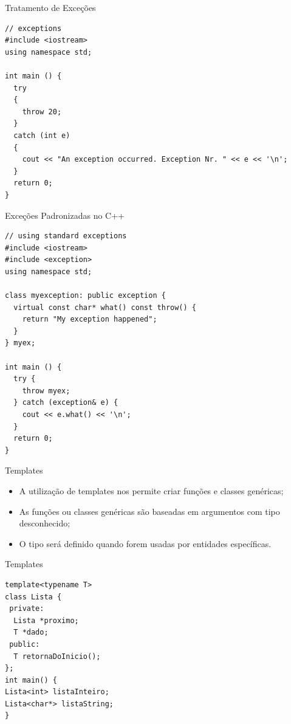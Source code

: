 \documentclass[12pt,table,xcolor={dvipsnames}]{beamer}
\begin{document}
\begin{frame}[fragile]{Tratamento de Exceções}
\begin{lstlisting}
// exceptions
#include <iostream>
using namespace std;

int main () {
  try
  {
    throw 20;
  }
  catch (int e)
  {
    cout << "An exception occurred. Exception Nr. " << e << '\n';
  }
  return 0;
}
\end{lstlisting}
\end{frame}

\begin{frame}[fragile]{Exceções Padronizadas no C++}
\begin{lstlisting}
// using standard exceptions
#include <iostream>
#include <exception>
using namespace std;

class myexception: public exception {
  virtual const char* what() const throw() {
    return "My exception happened";
  }
} myex;

int main () {
  try {
    throw myex;
  } catch (exception& e) {
    cout << e.what() << '\n';
  }
  return 0;
}
\end{lstlisting}
\end{frame}

\begin{frame}{Templates}
\begin{itemize}
\item A utilização de templates nos permite criar funções e classes genéricas;
\item As funções ou classes genéricas são baseadas em argumentos com tipo desconhecido;
\item O tipo será definido quando forem usadas por entidades específicas.
\end{itemize}
\end{frame}

\begin{frame}[fragile]{Templates}
\begin{lstlisting}
template<typename T>
class Lista {
 private:
  Lista *proximo;
  T *dado;
 public:
  T retornaDoInicio();
};
int main() {
Lista<int> listaInteiro;
Lista<char*> listaString;
}
\end{lstlisting}
\end{frame}
\end{document}

